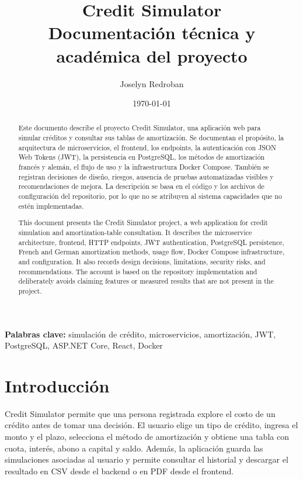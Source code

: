 \documentclass[12pt,a4paper]{article}
\title{\textbf{Credit Simulator}\\
\large Documentación técnica y académica del proyecto}
\author{Joselyn Redroban}
\date{\today}
\begin{document}
\maketitle

\begin{abstract}
Este documento describe el proyecto Credit Simulator, una aplicación web para
simular créditos y consultar sus tablas de amortización. Se documentan el
propósito, la arquitectura de microservicios, el frontend, los endpoints, la
autenticación con JSON Web Tokens (JWT), la persistencia en PostgreSQL, los
métodos de amortización francés y alemán, el flujo de uso y la infraestructura
Docker Compose. También se registran decisiones de diseño, riesgos, ausencia
de pruebas automatizadas visibles y recomendaciones de mejora. La descripción
se basa en el código y los archivos de configuración del repositorio, por lo
que no se atribuyen al sistema capacidades que no estén implementadas.
\end{abstract}

\textbf{Palabras clave:} simulación de crédito, microservicios, amortización,
JWT, PostgreSQL, ASP.NET Core, React, Docker

\begin{otherlanguage}{english}
\begin{abstract}
This document presents the Credit Simulator project, a web application for
credit simulation and amortization-table consultation. It describes the
microservice architecture, frontend, HTTP endpoints, JWT authentication,
PostgreSQL persistence, French and German amortization methods, usage flow,
Docker Compose infrastructure, and configuration. It also records design
decisions, limitations, security risks, and recommendations. The account is
based on the repository implementation and deliberately avoids claiming
features or measured results that are not present in the project.
\end{abstract}
\end{otherlanguage}

\tableofcontents
\newpage

\section{Introducción}

Credit Simulator permite que una persona registrada explore el costo de un
crédito antes de tomar una decisión. El usuario elige un tipo de crédito,
ingresa el monto y el plazo, selecciona el método de amortización y obtiene
una tabla con cuota, interés, abono a capital y saldo. Además, la aplicación
guarda las simulaciones asociadas al usuario y permite consultar el historial y
descargar el resultado en CSV desde el backend o en PDF desde el frontend.
\end{document}
